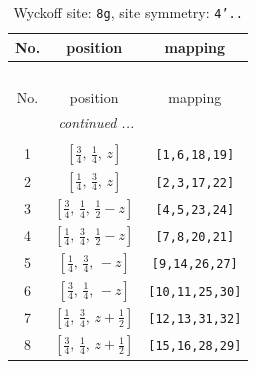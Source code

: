 \documentclass[fleqn,8pt]{jsarticle}
\begin{document}
\begin{longtable}{ccc}
\caption{Wyckoff site: {\tt 8g}, site symmetry: {\tt 4'..}}
 \\
 \hline \hline
No. & position & mapping \\ \hline \endfirsthead

\multicolumn{2}{l}{\tablename\ \thetable{}} \\
 \hline \hline
No. & position & mapping \\ \hline \endhead

 \hline \hline
\multicolumn{2}{r}{\footnotesize\it continued ...} \\ \endfoot

 \hline \hline
\multicolumn{2}{r}{} \\ \endlastfoot

1 & $\left[ \frac{3}{4},\, \frac{1}{4},\, z \right]$ & {\tt [1,6,18,19]} \\ \hline
2 & $\left[ \frac{1}{4},\, \frac{3}{4},\, z \right]$ & {\tt [2,3,17,22]} \\ \hline
3 & $\left[ \frac{3}{4},\, \frac{1}{4},\, \frac{1}{2} - z \right]$ & {\tt [4,5,23,24]} \\ \hline
4 & $\left[ \frac{1}{4},\, \frac{3}{4},\, \frac{1}{2} - z \right]$ & {\tt [7,8,20,21]} \\ \hline
5 & $\left[ \frac{1}{4},\, \frac{3}{4},\, - z \right]$ & {\tt [9,14,26,27]} \\ \hline
6 & $\left[ \frac{3}{4},\, \frac{1}{4},\, - z \right]$ & {\tt [10,11,25,30]} \\ \hline
7 & $\left[ \frac{1}{4},\, \frac{3}{4},\, z + \frac{1}{2} \right]$ & {\tt [12,13,31,32]} \\ \hline
8 & $\left[ \frac{3}{4},\, \frac{1}{4},\, z + \frac{1}{2} \right]$ & {\tt [15,16,28,29]} \\
\end{longtable}
\renewcommand{\arraystretch}{1.2}
\end{document}
